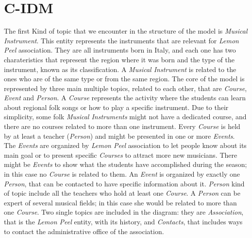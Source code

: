 \documentclass[../../DD.tex]{subfiles}
\begin{document}
\section{C-IDM}
	The first Kind of topic that we encounter in the structure of the model is \textit{Musical Instrument}. This entity represents the instruments that are relevant for \textit{Lemon Peel} association. They are all instruments born in Italy, and each one has two charateristics that represent the region where it was born and the type of the instrument, known as its classification. A \textit{Musical Instrument} is related to the ones who are of the same type or from the same region.
	\newline
	The core of the model is represented by three main multiple topics, related to each other, that are \textit{Course}, \textit{Event} and \textit{Person}. A \textit{Course} represents the activity where the students can learn about regional folk songs or how to play a specific instrument. Due to their simplicity, some folk \textit{Musical Instruments} might not have a dedicated course, and there are no courses related to more than one instrument. Every \textit{Course} is held by at least a teacher (\textit{Person}) and might be presented in one or more \textit{Events}.
	\newline
	The \textit{Events} are organized by \textit{Lemon Peel} association to let people know about its main goal or to present specific \textit{Courses} to attract more new musicians. There might be \textit{Events} to show what the students have accomplished during the season; in this case no \textit{Course} is related to them. An \textit{Event} is organized by exactly one \textit{Person}, that can be contacted to have specific information about it. 
	\newline
	\textit{Person} kind of topic include all the teachers who hold at least one \textit{Course}. A \textit{Person} can be expert of several musical fields; in this case she would be related to more than one \textit{Course}.
	\newline
	Two single topics are included in the diagram: they are \textit{Association}, that is the \textit{Lemon Peel} entity, with its history, and \textit{Contacts}, that includes ways to contact the administrative office of the association.
\end{document}
